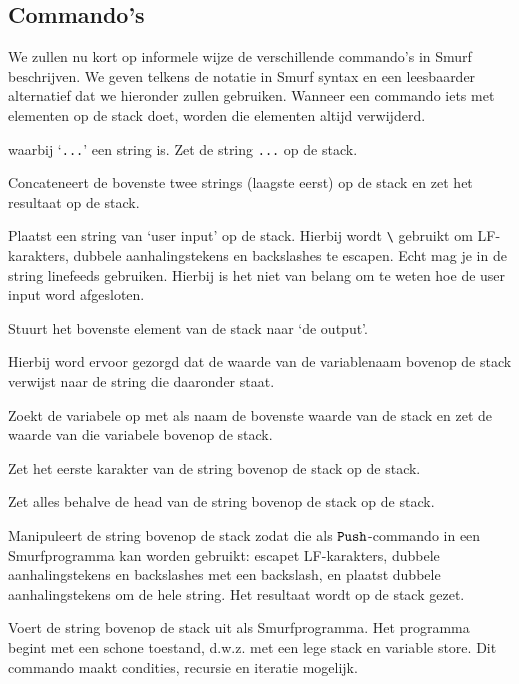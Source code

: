 \subsection{Commando's}
\label{sec:intro:commands}
We zullen nu kort op informele wijze de verschillende commando's in Smurf
beschrijven. We geven telkens de notatie in Smurf syntax en een leesbaarder
alternatief dat we hieronder zullen gebruiken. Wanneer een commando iets met
elementen op de stack doet, worden die elementen altijd verwijderd.

\begin{description}[style=nextline,font=\normalfont]
	\item[\smurfinline{"..."} of $\StmPush~\texttt{...}$]
		waarbij `\texttt{...}' een string is. Zet de string \texttt{...} op de
		stack.
	\item[\smurfinline{+} of $\StmCat$]
		Concateneert de bovenste twee strings (laagste eerst) op de stack en zet
		het resultaat op de stack.
	\item[\smurfinline{i} of $\StmInput$]
		Plaatst een string van `user input' op de stack. Hierbij wordt
		\texttt{\textbackslash} gebruikt om LF-karakters, dubbele aanhalingstekens
		en backslashes te escapen. Echt mag je in de string linefeeds gebruiken.
		Hierbij is het niet van belang om te weten hoe de user input word
		afgesloten.
	\item[\smurfinline{o} of $\StmOutput$]
		Stuurt het bovenste element van de stack naar `de output'.
	\item[\smurfinline{p} of $\StmPut$]
		Hierbij word ervoor gezorgd dat de waarde van de variablenaam bovenop de
		stack verwijst naar de string die daaronder staat.
    \item[\smurfinline{g} of $\StmGet$]
		Zoekt de variabele op met als naam de bovenste waarde van de stack en zet de waarde van die variabele bovenop de stack.
	\item[\smurfinline{h} of $\StmHead$]
		Zet het eerste karakter van de string bovenop de stack op de
		stack.
	\item[\smurfinline{t} of $\StmTail$]
		Zet alles behalve de head van de string bovenop de stack op de stack.
	\item[\smurfinline{q} of $\StmQuotify$]
		Manipuleert de string bovenop de stack zodat die als $\texttt{Push}$-commando in
		een Smurfprogramma kan worden gebruikt: escapet LF-karakters, dubbele
		aanhalingstekens en back\-slashes met een backslash, en plaatst dubbele
		aanhalingstekens om de hele string. Het resultaat wordt op de stack gezet.
	\item[\smurfinline{x} of $\StmExec$]
		Voert de string bovenop de stack uit als Smurfprogramma. Het programma
		begint met een schone toestand, d.w.z. met een lege stack en variable
		store. Dit commando maakt condities, recursie en iteratie mogelijk.
\end{description}

